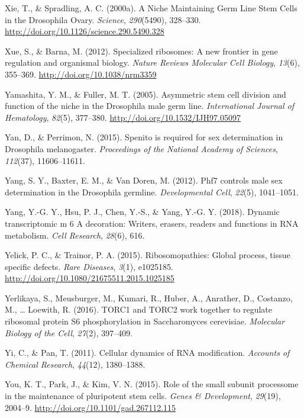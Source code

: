\documentclass[12pt,twoside]{reedthesis}
\newlength{\cslhangindent}
\newenvironment{cslreferences}%
  {\setlength{\parindent}{0pt}%
  \everypar{\setlength{\hangindent}{\cslhangindent}}\ignorespaces}%
  {\par}
\begin{document}
\begin{cslreferences}
\leavevmode\hypertarget{ref-Xie2000b}{}%
Xie, T., \& Spradling, A. C. (2000a). A Niche Maintaining Germ Line Stem Cells in the Drosophila Ovary. \emph{Science}, \emph{290}(5490), 328--330. \url{http://doi.org/10.1126/science.290.5490.328}

\leavevmode\hypertarget{ref-Xue2012}{}%
Xue, S., \& Barna, M. (2012). Specialized ribosomes: A new frontier in gene regulation and organismal biology. \emph{Nature Reviews Molecular Cell Biology}, \emph{13}(6), 355--369. \url{http://doi.org/10.1038/nrm3359}

\leavevmode\hypertarget{ref-Yamashita2005d}{}%
Yamashita, Y. M., \& Fuller, M. T. (2005). Asymmetric stem cell division and function of the niche in the Drosophila male germ line. \emph{International Journal of Hematology}, \emph{82}(5), 377--380. \url{http://doi.org/10.1532/IJH97.05097}

\leavevmode\hypertarget{ref-Yan2015}{}%
Yan, D., \& Perrimon, N. (2015). Spenito is required for sex determination in Drosophila melanogaster. \emph{Proceedings of the National Academy of Sciences}, \emph{112}(37), 11606--11611.

\leavevmode\hypertarget{ref-Yang2012}{}%
Yang, S. Y., Baxter, E. M., \& Van Doren, M. (2012). Phf7 controls male sex determination in the Drosophila germline. \emph{Developmental Cell}, \emph{22}(5), 1041--1051.

\leavevmode\hypertarget{ref-Yang2018}{}%
Yang, Y.-G. Y., Hsu, P. J., Chen, Y.-S., \& Yang, Y.-G. Y. (2018). Dynamic transcriptomic m 6 A decoration: Writers, erasers, readers and functions in RNA metabolism. \emph{Cell Research}, \emph{28}(6), 616.

\leavevmode\hypertarget{ref-Yelick2015a}{}%
Yelick, P. C., \& Trainor, P. A. (2015). Ribosomopathies: Global process, tissue specific defects. \emph{Rare Diseases}, \emph{3}(1), e1025185. \url{http://doi.org/10.1080/21675511.2015.1025185}

\leavevmode\hypertarget{ref-Yerlikaya2016a}{}%
Yerlikaya, S., Meusburger, M., Kumari, R., Huber, A., Anrather, D., Costanzo, M., \ldots{} Loewith, R. (2016). TORC1 and TORC2 work together to regulate ribosomal protein S6 phosphorylation in Saccharomyces cerevisiae. \emph{Molecular Biology of the Cell}, \emph{27}(2), 397--409.

\leavevmode\hypertarget{ref-Yi2011}{}%
Yi, C., \& Pan, T. (2011). Cellular dynamics of RNA modification. \emph{Accounts of Chemical Research}, \emph{44}(12), 1380--1388.

\leavevmode\hypertarget{ref-You2015}{}%
You, K. T., Park, J., \& Kim, V. N. (2015). Role of the small subunit processome in the maintenance of pluripotent stem cells. \emph{Genes \& Development}, \emph{29}(19), 2004--9. \url{http://doi.org/10.1101/gad.267112.115}


\end{cslreferences}
\end{document}
